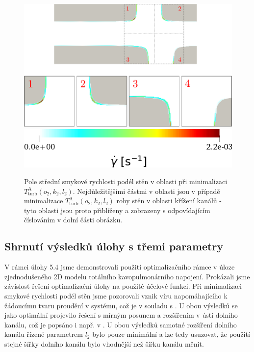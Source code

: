 \begin{figure}[H]
	\centering
	\includegraphics[width=0.92	\textwidth]{Images/tcpc/rohy/tcpc_tke.pdf}\\[25pt]
	\includegraphics[width=0.55	\textwidth]{Images/tcpc/tcpc_dotgamma_dotgamma_ legenda.png}
	\caption{Pole střední smykové rychlosti podél stěn v oblasti při minimalizaci $ T^{\text{A}}_{\text{turb}} (o_2, k_2, l_2) $. Nejdůležitějšími částmi v oblasti jsou v případě minimalizace $ T^{\text{A}}_{\text{turb}} (o_2, k_2, l_2) $ rohy stěn v oblasti křížení kanálů - tyto oblasti jsou proto přiblíženy a zobrazeny s odpovídajícím číslováním v dolní části obrázku.}
	\label{fig:tcpc tke shear rate}
\end{figure}

\subsection{Shrnutí výsledků úlohy s třemi parametry}
V rámci úlohy 5.4 jsme demonstrovali použití optimalizačního rámce v úloze zjednodušeného 2D modelu totálního kavopulmonárního napojení. Prokázali jsme závislost řešení optimalizační úlohy na použité účelové funkci. Při minimalizaci smykové rychlosti podél stěn jsme pozorovali vznik víru napomáhajícího k žádoucímu tvaru proudění v systému, což je v souladu s \cite{Rijnberg2018}. U obou výsledků se jako optimální projevilo řešení s mírným posunem a rozšířením v ústí dolního kanálu, což je popsáno i např. v \cite{Rijnberg2018, Porfiryev2020, Ensley1999}. U obou výsledků samotné rozšíření dolního kanálu řízené parametrem $ l_2 $ bylo pouze minimální a lze tedy usuzovat, že použití stejné šířky dolního kanálu bylo vhodnější než šířku kanálu měnit.